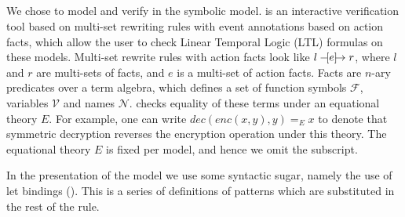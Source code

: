 \subsection{\mTamarin{}}
\label{sec:tamarin}
 
We chose \mTamarin{} to model and verify \mEdhoc{} in the symbolic model.
%
\mTamarin{} is an interactive verification tool based on multi-set rewriting rules
with event annotations based on action facts, which allow the user to check
 Linear Temporal Logic (LTL) formulas on these models.
%
Multi-set rewrite rules with action facts look like $ l \ifarrow[e] r $,
where $l$ and $r$ are multi-sets of facts, and $e$ is a multi-set of action facts.
Facts are $n$-ary predicates over a term algebra, which defines a set of function
symbols $\mathcal F$, variables $\mathcal V$ and names $\mathcal N$. \mTamarin{}
checks equality of these terms under an equational theory $E$. For example,
one can write $ dec(enc(x,y),y) =_E x $
to denote that symmetric decryption reverses the encryption operation under this theory.
The equational theory $E$ is fixed per model, and hence we omit the subscript.

In the presentation of the model we use some syntactic
sugar, namely
the use of let bindings (). This is a series of
definitions of patterns which are substituted in the rest of the rule. \\

%

